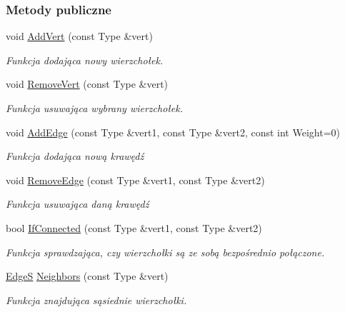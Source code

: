 \subsubsection*{Metody publiczne}
\begin{DoxyCompactItemize}
\item 
void \hyperlink{class_graph_a84f49d65277ccfc60f81e68917a7fdae}{Add\-Vert} (const Type \&vert)
\begin{DoxyCompactList}\small\item\em Funkcja dodająca nowy wierzchołek. \end{DoxyCompactList}\item 
void \hyperlink{class_graph_a2f53b458b99203c19da38104a664bc20}{Remove\-Vert} (const Type \&vert)
\begin{DoxyCompactList}\small\item\em Funkcja usuwająca wybrany wierzchołek. \end{DoxyCompactList}\item 
void \hyperlink{class_graph_aae489b31f187f64acf6f5efae1a65f0d}{Add\-Edge} (const Type \&vert1, const Type \&vert2, const int Weight=0)
\begin{DoxyCompactList}\small\item\em Funkcja dodająca nową krawędź \end{DoxyCompactList}\item 
void \hyperlink{class_graph_a4309acd8672c69fd20c375314b92b05f}{Remove\-Edge} (const Type \&vert1, const Type \&vert2)
\begin{DoxyCompactList}\small\item\em Funkcja usuwająca daną krawędź \end{DoxyCompactList}\item 
bool \hyperlink{class_graph_ab9088965bdcbbcfad7110e17ea5276f1}{If\-Connected} (const Type \&vert1, const Type \&vert2)
\begin{DoxyCompactList}\small\item\em Funkcja sprawdzająca, czy wierzchołki są ze sobą bezpośrednio połączone. \end{DoxyCompactList}\item 
\hyperlink{class_graph_a48cb28a87e5956064f989ae80caf3f06}{Edge\-S} \hyperlink{class_graph_a589df548c5f9f3b77bc4a64cd38e3320}{Neighbors} (const Type \&vert)
\begin{DoxyCompactList}\small\item\em Funkcja znajdująca sąsiednie wierzchołki. \end{DoxyCompactList}\end{DoxyCompactItemize}
